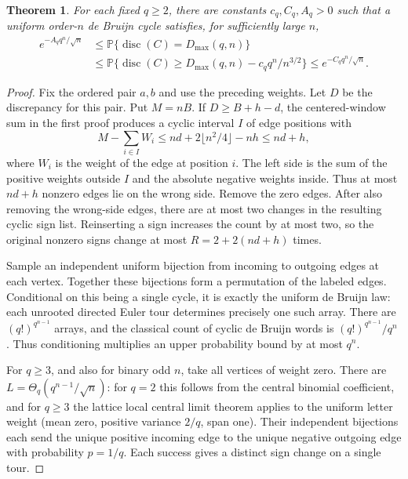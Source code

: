 \documentclass[11pt]{article}
\newtheorem{theorem}{Theorem}
\begin{document}
\begin{theorem}
For each fixed \(q\ge2\), there are constants \(c_q,C_q,A_q>0\) such
that a uniform order-\(n\) de Bruijn cycle satisfies, for sufficiently
large \(n\),
\[
\begin{aligned}
 e^{-A_q q^n/\sqrt n}
 &\le {\mathbb P}\{\operatorname{disc}(C)=D_{\max}(q,n)\}\\
 &\le {\mathbb P}\{\operatorname{disc}(C)\ge D_{\max}(q,n)-c_q q^n/n^{3/2}\}
 \le e^{-C_q q^n/\sqrt n}.
\end{aligned}
\]
\end{theorem}
\begin{proof}
Fix the ordered pair \(a,b\) and use the preceding weights.
Let \(D\) be the discrepancy for this pair. Put \(M=nB\).
If \(D\ge B+h-d\), the centered-window sum in the first proof
produces a cyclic interval \(I\) of edge positions with
\[
 M-\sum_{i\in I} W_i
 \le nd+2\lfloor n^2/4\rfloor-nh\le nd+h,
\]
where \(W_i\) is the weight of the edge at position \(i\).
The left side is the sum of the positive weights outside \(I\)
and the absolute negative weights inside. Thus at most \(nd+h\)
nonzero edges lie on the wrong side. Remove the zero edges.
After also removing the wrong-side edges, there are at most two
changes in the resulting cyclic sign list. Reinserting a sign
increases the count by at most two, so the original nonzero signs
change at most \(R=2+2(nd+h)\) times.

Sample an independent uniform bijection from incoming to outgoing
edges at each vertex. Together these bijections form a permutation
of the labeled edges. Conditional on this being a single cycle,
it is exactly the uniform de Bruijn law: each unrooted directed
Euler tour determines precisely one such array. There are
\((q!)^{q^{n-1}}\) arrays, and the classical count of cyclic
de Bruijn words is \((q!)^{q^{n-1}}/q^n\) \cite{AE}.
Thus conditioning multiplies an upper probability bound by at
most \(q^n\).

For \(q\ge3\), and also for binary odd \(n\), take all vertices
of weight zero. There are \(L=\Theta_q(q^{n-1}/\sqrt n)\):
for \(q=2\) this follows from the central binomial coefficient,
and for \(q\ge3\) the lattice local central limit theorem
applies to the uniform letter weight (mean zero, positive
variance \(2/q\), span one). Their independent bijections each
send the unique positive incoming edge to the unique negative
outgoing edge with probability \(p=1/q\). Each success gives a
distinct sign change on a single tour.


\end{proof}
\end{document}
